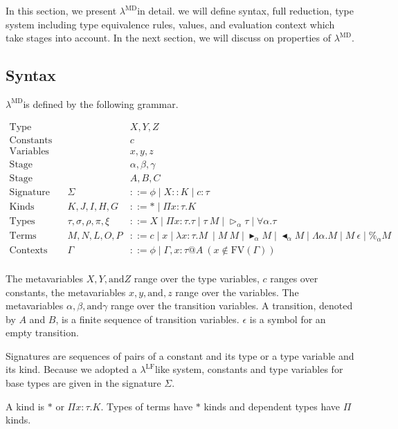 \documentclass[runningheads]{llncs}
\newcommand{\LMD}{$\lambda^{\textrm{MD}}$}
\newcommand{\LLF}{$\lambda^{\textrm{LF}}$}
\newcommand{\G}{\Gamma}
\newcommand{\TW}{\triangleright}
\newcommand{\F}{\forall}
\newcommand{\TB}{\blacktriangleright}
\newcommand{\TBL}{\blacktriangleleft}
\begin{document}
In this section, we present \LMD in detail. we will define syntax, full reduction, type system including type equivalence rules, values, and evaluation context which take stages into account.
In the next section, we will discuss on properties of \LMD.

\subsection{Syntax}

\LMD is defined by the following grammar.

\begin{align*}
    \textrm{Type variables} && & X,Y,Z \\
    \textrm{Constants} && & c \\
    \textrm{Variables} && & x,y,z \\
    \textrm{Stage variables} && & \alpha,\beta,\gamma \\
    \textrm{Stage} && & A,B,C \\
    \textrm{Signature} && \Sigma & ::= \phi \mid X::K \mid c:\tau \\
    \textrm{Kinds} && K,J,I,H,G & ::= * \mid \Pi x:\tau.K\\
    \textrm{Types} && \tau,\sigma,\rho,\pi,\xi & ::= X \mid \Pi x:\tau.\tau \mid \tau\ M \mid \TW_{\alpha} \tau \mid \F\alpha.\tau \\
    \textrm{Terms} && M,N,L,O,P & ::= c \mid x \mid \lambda x:\tau.M\ \mid M\ M \mid \TB_\alpha M 
    \mid \TBL_\alpha M \mid \Lambda\alpha.M \mid M\ \epsilon \mid \%_\alpha M\\ 
    \textrm{Contexts} && \Gamma & ::= \phi \mid  \Gamma,x:\tau@A\ (x\not\in\textrm{FV}(\G)) \\
\end{align*}

The metavariables $X, Y, \text{and} Z$ range over the type variables, $c$ ranges over constants, the metavariables $x, y, \text{and}, z$ range over the variables.
The metavariables $\alpha, \beta, \text{and} \gamma$ range over the transition variables.
A transition, denoted by $A$ and $B$, is a finite sequence of transition variables.
$\epsilon$ is a symbol for an empty transition.

Signatures are sequences of pairs of a constant and its type or a type variable and its kind.
Because we adopted a \LLF like system, constants and type variables for base types are given in the signature $\Sigma$.

A kind is $*$ or $\Pi x:\tau.K$. Types of terms have $*$ kinds and dependent types have $\Pi$ kinds.
\end{document}
